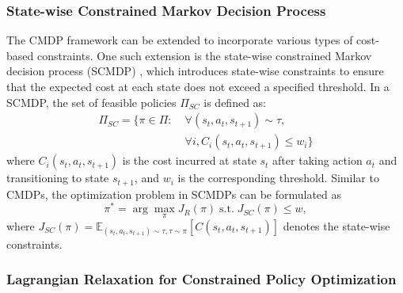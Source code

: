 \subsubsection{State-wise Constrained Markov Decision Process}

The CMDP framework can be extended to incorporate various types of cost-based constraints.
One such extension is the state-wise constrained Markov decision process (SCMDP) \cite{zhao2023state}, which introduces state-wise constraints to ensure that the expected cost at each state does not exceed a specified threshold.
In a SCMDP, the set of feasible policies $\Pi_{SC}$ is defined as:
\begin{equation} \label{eq:feasible_policy_set_scmdp}
    \begin{aligned}    
        \Pi_{SC} = \{ \pi \in \Pi: &\; \forall (s_t, a_t, s_{t + 1}) \sim \tau, \\
                                &\; \forall i, C_i(s_t, a_t, s_{t + 1}) \leq w_i \}
    \end{aligned}
\end{equation}
where $C_i(s_t, a_t, s_{t + 1})$ is the cost incurred at state $s_t$ after taking action $a_t$ and transitioning to state $s_{t + 1}$, and $w_i$ is the corresponding threshold.
Similar to CMDPs, the optimization problem in SCMDPs can be formulated as
\begin{equation} \label{eq:scmdp_optimization_problem}
    \pi^* = \arg\max_\pi J_R(\pi) \; \text{s.t.} \; J_{SC}(\pi) \leq w ,
\end{equation}
where $J_{SC}(\pi) = \mathbb{E}_{(s_t, a_t, s_{t + 1}) \sim \tau, \tau \sim \pi} [C(s_t, a_t, s_{t + 1})]$ denotes the state-wise constraints.  %

\subsubsection{Lagrangian Relaxation for Constrained Policy Optimization}

